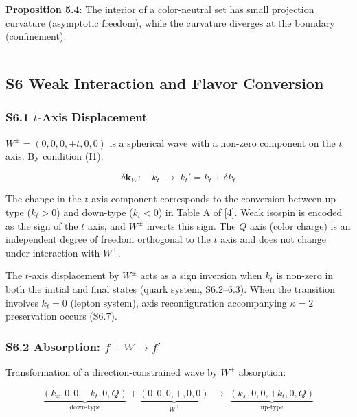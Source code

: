 \documentclass[
  a4paper,11pt]{article}
\theoremstyle{definition}
\theoremstyle{remark}
\begin{document}
\textbf{Proposition 5.4}: The interior of a color-neutral set has small
projection curvature (asymptotic freedom), while the curvature diverges
at the boundary (confinement).

\begin{center}\rule{0.5\linewidth}{0.5pt}\end{center}

\subsection{S6 Weak Interaction and Flavor
Conversion}\label{s6-weak-interaction-and-flavor-conversion}

\subsubsection{\texorpdfstring{S6.1 \(t\)-Axis
Displacement}{S6.1 t-Axis Displacement}}\label{s6.1-t-axis-displacement}

\(W^{\pm} = (0, 0, 0, \pm t, 0, 0)\) is a spherical wave with a non-zero
component on the \(t\) axis. By condition (I1):

\[\delta\mathbf{k}_W: \quad k_t \;\longrightarrow\; k_t' = k_t + \delta k_t\]

The change in the \(t\)-axis component corresponds to the conversion
between up-type (\(k_t > 0\)) and down-type (\(k_t < 0\)) in Table A of
{[}4{]}. Weak isospin is encoded as the sign of the \(t\) axis, and
\(W^{\pm}\) inverts this sign. The \(Q\) axis (color charge) is an
independent degree of freedom orthogonal to the \(t\) axis and does not
change under interaction with \(W^{\pm}\).

The \(t\)-axis displacement by \(W^{\pm}\) acts as a sign inversion when
\(k_t\) is non-zero in both the initial and final states (quark system,
S6.2--6.3). When the transition involves \(k_t = 0\) (lepton system),
axis reconfiguration accompanying \(\kappa = 2\) preservation occurs
(S6.7).

\subsubsection{\texorpdfstring{S6.2 Absorption:
\(f + W \to f'\)}{S6.2 Absorption: f + W \textbackslash to f\textquotesingle{}}}\label{s6.2-absorption-f-w-to-f}

Transformation of a direction-constrained wave by \(W^+\) absorption:

\[\underbrace{(k_x, 0, 0, -k_t, 0, Q)}_{\text{down-type}} + \underbrace{(0, 0, 0, +, 0, 0)}_{W^+} \;\longrightarrow\; \underbrace{(k_x, 0, 0, +k_t, 0, Q)}_{\text{up-type}}\]
\end{document}

